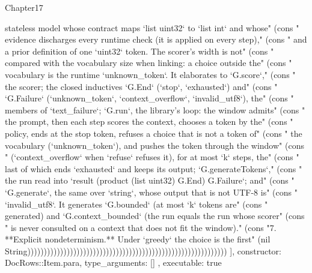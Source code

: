\begin{lexlean}{Chapter17}
\begin{semanticmodule}
{{  stateless model whose contract maps `list uint32` to `list int` and whose" (cons "   evidence discharges every runtime check (it is applied on every step)," (cons "   and a prior definition of one `uint32` token. The scorer's width is not" (cons "   compared with the vocabulary size when linking: a choice outside the" (cons "   vocabulary is the runtime `unknown_token`. It elaborates to `G.score`," (cons "   the scorer; the closed inductives `G.End` (`stop`, `exhausted`) and" (cons "   `G.Failure` (`unknown_token`, `context_overflow`, `invalid_utf8`), the" (cons "   members of `text_failure`; `G.run`, the library's loop: the window admits" (cons "   the prompt, then each step scores the context, chooses a token by the" (cons "   policy, ends at the stop token, refuses a choice that is not a token of" (cons "   the vocabulary (`unknown_token`), and pushes the token through the window" (cons "   (`context_overflow` when `refuse` refuses it), for at most `k` steps, the" (cons "   last of which ends `exhausted` and keeps its output; `G.generateTokens`," (cons "   the run read into `result (product (list uint32) G.End) G.Failure`; and" (cons "   `G.generate`, the same over `string`, whose output that is not UTF-8 is" (cons "   `invalid_utf8`. It generates `G.bounded` (at most `k` tokens are" (cons "   generated) and `G.context_bounded` (the run equals the run whose scorer" (cons "   is never consulted on a context that does not fit the window)." (cons "7. **Explicit nondeterminism.** Under `greedy` the choice is the first" (nil String)))))))))))))))))))))))))))))))))))))))))))))))))))))))))))))
    ],
    constructor: DocRows::Item.para,
    type_arguments: []
  },
  executable: true
}


\end{semanticmodule}
\end{lexlean}
